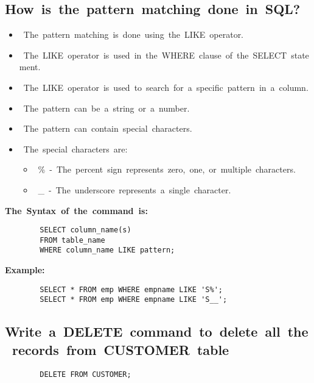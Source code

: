 \documentclass{article}
\begin{document}
	\subsection{\textbf{How is the pattern matching done in SQL?}} 
	\begin{itemize} 
		\item The pattern matching is done using the LIKE operator. 
		\item The LIKE operator is used in the WHERE clause of the SELECT statement. 
		\item The LIKE operator is used to search for a specific pattern in a column. 
		\item The pattern can be a string or a number. 
		\item The pattern can contain special characters. 
		\item The special characters are: 
		\begin{itemize} 
			\item \% - The percent sign represents zero, one, or multiple characters. 
			\item \_ - The underscore represents a single character. 
		\end{itemize} 
	\end{itemize} 
	\textbf{The Syntax of the command is:} 
	\begin{verbatim} 
		SELECT column_name(s) 
		FROM table_name 
		WHERE column_name LIKE pattern; 
	\end{verbatim} 
	\textbf{Example:} 
	\begin{verbatim} 
		SELECT * FROM emp WHERE empname LIKE 'S%'; 
		SELECT * FROM emp WHERE empname LIKE 'S__'; 
	\end{verbatim} 
	
	\subsection{\textbf{Write a DELETE command to delete all the records from CUSTOMER table}} 
	\begin{verbatim} 
		DELETE FROM CUSTOMER; 
	\end{verbatim} 
\end{document}
